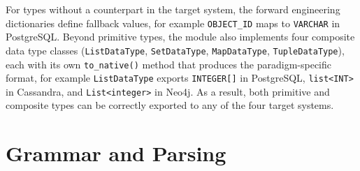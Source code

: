 For types without a counterpart in the target system, the forward engineering dictionaries define fallback values, for example \texttt{OBJECT\_ID} maps to
  \texttt{VARCHAR} in PostgreSQL. Beyond primitive types, the module also implements four composite data type classes (\texttt{ListDataType}, \texttt{SetDataType},
  \texttt{MapDataType}, \texttt{TupleDataType}), each with its own \texttt{to\_native()} method that produces the paradigm-specific format, for example
  \texttt{ListDataType} exports \texttt{INTEGER[]} in PostgreSQL, \texttt{list<INT>} in Cassandra, and \texttt{List<integer>} in Neo4j. As a result, both primitive and composite types can be correctly exported to any of the four target systems.


\section{Grammar and Parsing}\label{sec:parser-impl}

